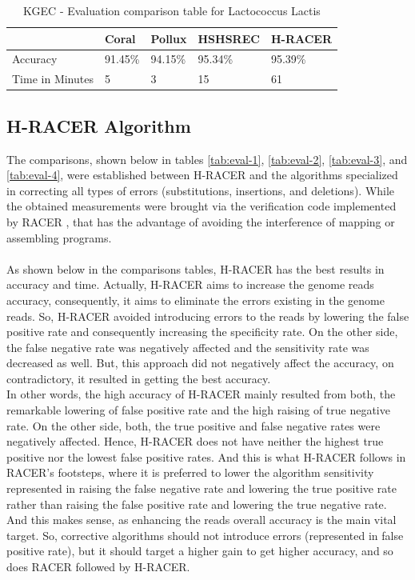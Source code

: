 \documentclass[12pt,openany]{llncs}
\newcommand{\TBstrut}{{\rule{0pt}{7ex}}{\rule[2ex]{0pt}{0pt}}} %
\begin{document}
\begin{longtable}{|m{33mm}|m{20mm}|m{20mm}|m{20mm}|m{20mm}|}
	    \caption{\label{tab:eval-0}KGEC - Evaluation comparison table for Lactococcus Lactis}\\
        \hline
           & Coral & Pollux & HSHSREC & H-RACER\cellcolor{DarkGray} \TBstrut\\ %
        \hline
           Accuracy & 91.45\% & 94.15\% & 95.34\% & 95.39\%\cellcolor{LightGray} \TBstrut\\ %
        \hline
           Time in Minutes& 5 & 3 & 15 & 61\cellcolor{LightGray} \TBstrut\\ %
        \hline
\end{longtable}


\subsection{\label{subsec:eval2-res}H-RACER Algorithm}
The comparisons, shown below in tables \ref{tab:eval-1}, \ref{tab:eval-2}, \ref{tab:eval-3}, and \ref{tab:eval-4}, were established between H-RACER and the algorithms specialized in correcting all types of errors (substitutions, insertions, and deletions). While the obtained measurements were brought via the verification code implemented by RACER \cite{Racer}, that has the advantage of avoiding the interference of mapping or assembling programs. 
\\\\
As shown below in the comparisons tables, H-RACER has the best results in accuracy and time. Actually, H-RACER aims to increase the genome reads accuracy, consequently, it aims to eliminate the errors existing in the genome reads. So, H-RACER avoided introducing errors to the reads by lowering the false positive rate and consequently increasing the specificity rate. On the other side, the false negative rate was negatively affected and the sensitivity rate was decreased as well. But, this approach did not negatively affect the accuracy, on contradictory, it resulted in getting the best accuracy.
\\
In other words, the high accuracy of H-RACER mainly resulted from both, the remarkable lowering of false positive rate and the high raising of true negative rate. On the other side, both, the true positive and false negative rates were negatively affected. Hence, H-RACER does not have neither the highest true positive nor the lowest false positive rates. And this is what H-RACER follows in RACER's footsteps, where it is preferred to lower the algorithm sensitivity represented in raising the false negative rate and lowering the true positive rate rather than raising the false positive rate and lowering the true negative rate. And this makes sense, as enhancing the reads overall accuracy is the main vital target. So, corrective algorithms should not introduce errors (represented in false positive rate), but it should target a higher gain to get higher accuracy, and so does RACER followed by H-RACER.
\end{document}
